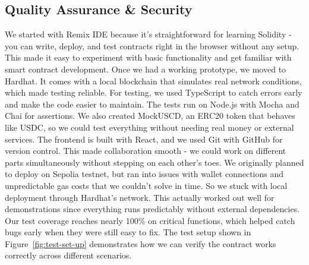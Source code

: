 \documentclass[11pt,a4paper]{article}
\begin{document}
    \subsection{Quality Assurance \& Security}\label{subsec:qa-security}
   We started with Remix IDE because it's straightforward for learning Solidity - you can write, deploy, and test contracts right in the browser without any setup.
   This made it easy to experiment with basic functionality and get familiar with smart contract development.
    Once we had a working prototype, we moved to Hardhat.
   It comes with a local blockchain that simulates real network conditions, which made testing reliable.
    For testing, we used TypeScript to catch errors early and make the code easier to maintain.
   The tests run on Node.js with Mocha and Chai for assertions.
   We also created MockUSCD, an ERC20 token that behaves like USDC, so we could test everything without needing real money or external services.
    The frontend is built with React, and we used Git with GitHub for version control.
   This made collaboration smooth - we could work on different parts simultaneously without stepping on each other's toes.
    We originally planned to deploy on Sepolia testnet, but ran into issues with wallet connections and unpredictable gas costs that we couldn't solve in time.
   So we stuck with local deployment through Hardhat's network.
   This actually worked out well for demonstrations since everything runs predictably without external dependencies.
    Our test coverage reaches nearly 100\% on critical functions, which helped catch bugs early when they were still easy to fix.
    The test setup shown in Figure~\ref{fig:test-set-up} demonstrates how we can verify the contract works correctly across different scenarios.


\end{document}

